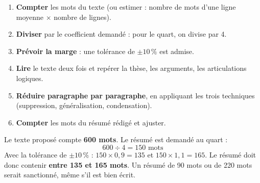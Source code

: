 \documentclass[11pt]{article}
\begin{document}
\begin{methode}
\begin{enumerate}
\item \textbf{Compter} les mots du texte (ou estimer : nombre de mots d'une ligne moyenne $\times$ nombre de lignes).
\item \textbf{Diviser} par le coefficient demandé : pour le quart, on divise par 4.
\item \textbf{Prévoir la marge} : une tolérance de $\pm 10\,\%$ est admise.
\item \textbf{Lire} le texte deux fois et repérer la thèse, les arguments, les articulations logiques.
\item \textbf{Réduire paragraphe par paragraphe}, en appliquant les trois techniques (suppression, généralisation, condensation).
\item \textbf{Compter} les mots du résumé rédigé et ajuster.
\end{enumerate}
\end{methode}

\begin{exemplebox}
Le texte proposé compte \textbf{600 mots}. Le résumé est demandé au quart :
\[ 600 \div 4 = 150 \text{ mots} \]
Avec la tolérance de $\pm 10\,\%$ : $150 \times 0{,}9 = 135$ et $150 \times 1{,}1 = 165$. Le résumé doit donc contenir \textbf{entre 135 et 165 mots}. Un résumé de 90 mots ou de 220 mots serait sanctionné, même s'il est bien écrit.
\end{exemplebox}
\end{document}
